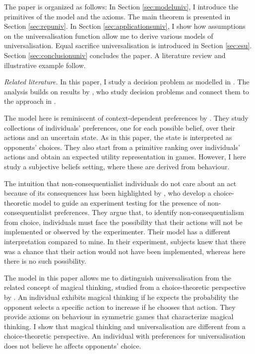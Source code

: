 The paper is organized as follows: In Section \ref{sec:modeluniv}, I introduce the primitives of the model and the axioms. The main theorem is presented in Section \ref{sec:repuniv}. In Section \ref{sec:applicationsuniv}, I show how assumptions on the universalisation function allow me to derive various models of universalisation. Equal sacrifice universalisation is introduced in Section \ref{sec:esu}. Section \ref{sec:conclusionuniv} concludes the paper. A literature review and illustrative example follow.

\textit{Related literature.} In this paper, I study a decision problem as modelled in \cite{luce1957games}. The analysis builds on results by \cite{battigalliMixedExtensionsDecision2017}, who study \citeauthor{luce1957games} decision problems and connect them to the approach in \cite{anscombeDefinitionSubjectiveProbability1963}.

The model here is reminiscent of context-dependent preferences by \cite{gilboaDerivationExpectedUtility2003}. They study collections of individuals' preferences, one for each possible belief, over their actions and an uncertain state. As in this paper, the state is interpreted as opponents' choices. They also start from a primitive ranking over individuals' actions and obtain an expected utility representation in games. However, I here study a subjective beliefs setting, where these are derived from behaviour.

The intuition that non-consequentialist individuals do not care about an act because of its consequences has been highlighted by \cite{chenSocialPreferencesSacred2022}, who develop a choice-theoretic model to guide an experiment testing for the presence of non-consequentialist preferences. They argue that, to identify non-consequentialism from choice, individuals must face the possibility that their actions will not be implemented or observed by the experimenter. Their model has a different interpretation compared to mine. In their experiment, subjects knew that there was a chance that their action would not have been implemented, whereas here there is no such possibility.

The model in this paper allows me to distinguish universalisation from the related concept of magical thinking, studied from a choice-theoretic perspective by \cite{daleyMagicalThinkingRepresentation2017}. An individual exhibits magical thinking if he expects the probability the opponent selects a specific action to increase if he chooses that action. They provide axioms on behaviour in symmetric games that characterize magical thinking. I show that magical thinking and universalisation are different from a choice-theoretic perspective. An individual with preferences for universalisation does not believe he affects opponents' choice.

